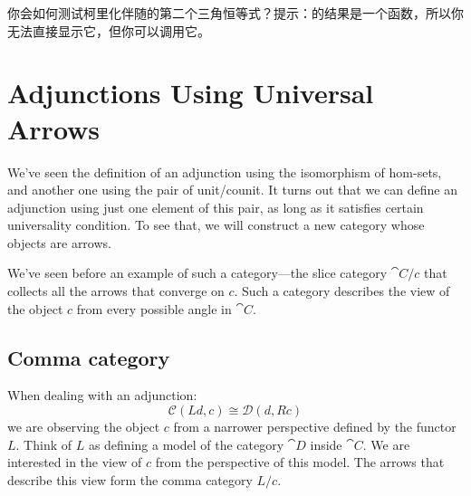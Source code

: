 \documentclass[DaoFP]{subfiles}
\begin{document}
    \begin{exercise}
        你会如何测试柯里化伴随的第二个三角恒等式？提示：的结果是一个函数，所以你无法直接显示它，但你可以调用它。
    \end{exercise}

    \section{Adjunctions Using Universal Arrows}

We've seen the definition of an adjunction using the isomorphism of hom-sets, and another one using the pair of unit/counit. It turns out that we can define an adjunction using just one element of this pair, as long as it satisfies certain universality condition. To see that, we will construct a new category whose objects are arrows. 

We've seen before an example of such a category---the slice category $\cat C/ c$ that collects all the arrows that converge on $c$. Such a category describes the view of the object $c$ from every possible angle in $\cat C$. 

\subsection{Comma category}
When dealing with an adjunction:
\[  \mathcal{C} (L d, c) \cong \mathcal{D}( d , R c)\]
we are observing the object $c$ from a narrower perspective defined by the functor $L$. Think of $L$ as defining a model of the category $\cat D$ inside $\cat C$. We are interested in the view of $c$ from the perspective of this model. The arrows that describe this view form the comma category $L/c$.
\end{document}
